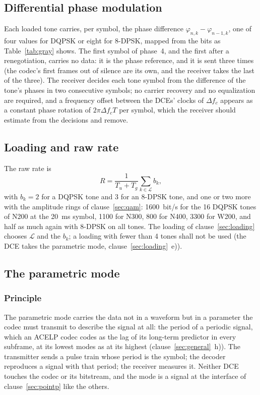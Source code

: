 \subsection{Differential phase modulation}
Each loaded tone carries, per symbol, the phase difference
$\varphi_{n,k} - \varphi_{n-1,k}$, one of four values for DQPSK or eight for
8-DPSK, mapped from the bits as Table~\ref{tab:gray} shows.  The first
symbol of phase~4, and the first after a renegotiation, carries no data:
it is the phase reference, and it is sent three times (the codec's first
frames out of silence are its own, and the receiver takes the last of the
three).  The receiver decides each tone symbol from the
difference of the tone's phases in two consecutive symbols; no carrier
recovery and no equalization are required, and a frequency offset between
the DCEs' clocks of $\Delta f_c$ appears as a constant phase rotation of
$2\pi \Delta f_c T$ per symbol, which the receiver should estimate from
the decisions and remove.

\subsection{Loading and raw rate}
The raw rate is
\[ R = \frac{1}{T_u + T_g} \sum_{k \in \mathcal{L}} b_k, \]
with $b_k = 2$ for a DQPSK tone and 3 for an 8-DPSK tone, and one or two
more with the amplitude rings of clause~\ref{sec:qam}: 1600~bit/s for the
16 DQPSK tones of N200 at the 20~ms symbol, 1100 for N300, 800 for N400,
3300 for W200, and half as much again with 8-DPSK on all tones.  The loading of clause~\ref{sec:loading} chooses $\mathcal{L}$
and the $b_k$; a loading with fewer than 4 tones shall not be used (the
DCE takes the parametric mode, clause~\ref{sec:loading}~e)).

\subsection{The parametric mode}\label{sec:parametric}
\subsubsection{Principle}
The parametric mode carries the data not in a waveform but in a
parameter the codec must transmit to describe the signal at all: the
period of a periodic signal, which an ACELP codec codes as the lag of
its long-term predictor in every subframe, at its lowest modes as at its
highest (clause~\ref{sec:general}~h)).  The transmitter sends a pulse
train whose period is the symbol; the decoder reproduces a signal with
that period; the receiver measures it.  Neither DCE touches the codec or
its bitstream, and the mode is a signal at the interface of
clause~\ref{sec:pointp} like the others.

